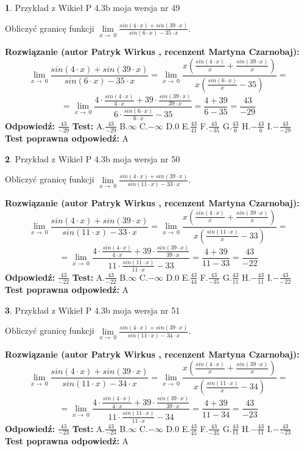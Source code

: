 \documentclass[12pt, a4paper]{article}
\theoremstyle{definition} %
\newtheorem{zad}{}
\newcommand{\zadStart}[1]{\begin{zad}#1\newline}
\newcommand{\zadStop}{\end{zad}}
\newcommand{\rozwStart}[2]{\noindent \textbf{Rozwiązanie (autor #1 , recenzent #2): }\newline}
\newcommand{\rozwStop}{\newline}
\newcommand{\odpStart}{\noindent \textbf{Odpowiedź:}\newline}
\newcommand{\odpStop}{\newline}
\newcommand{\testStart}{\noindent \textbf{Test:}\newline}
\newcommand{\testStop}{\newline}
\newcommand{\kluczStart}{\noindent \textbf{Test poprawna odpowiedź:}\newline}
\newcommand{\kluczStop}{\newline}
\begin{document}
\zadStart{Przykład z Wikieł P 4.3b moja wersja nr 49}


Obliczyć granicę funkcji $\lim\limits_{x\to\ 0}\frac{sin(4 \cdot x)+sin(39 \cdot x)}{sin(6 \cdot x)-35 \cdot x}$.
\zadStop
\rozwStart{Patryk Wirkus}{Martyna Czarnobaj}
$$\lim\limits_{x\to\ 0}\frac{sin(4 \cdot x)+sin(39 \cdot x)}{sin(6 \cdot x)-35 \cdot x}=\lim\limits_{x\to\ 0}\frac{x(\frac{sin(4 \cdot x)}{x}+\frac{sin(39 \cdot x)}{x})}{x(\frac{sin(6 \cdot x)}{x}-35)}=$$
$$=\lim\limits_{x\to\ 0}\frac{4 \cdot \frac{sin(4 \cdot x)}{4 \cdot x}+39 \cdot \frac{sin(39 \cdot x)}{39 \cdot x}}{6 \cdot \frac{sin(6 \cdot x)}{6 \cdot x}-35}=\frac{4+39}{6-35} = \frac{43}{-29}$$
\rozwStop
\odpStart
$\frac{43}{-29}$
\odpStop
\testStart
A.$\frac{43}{-29}$
B.$\infty$
C.$-\infty$
D.$0$
E.$\frac{43}{41}$
F.$\frac{43}{-35}$
G.$\frac{43}{6}$
H.$-\frac{43}{6}$
I.$-\frac{43}{-29}$
\testStop
\kluczStart
A
\kluczStop



\zadStart{Przykład z Wikieł P 4.3b moja wersja nr 50}


Obliczyć granicę funkcji $\lim\limits_{x\to\ 0}\frac{sin(4 \cdot x)+sin(39 \cdot x)}{sin(11 \cdot x)-33 \cdot x}$.
\zadStop
\rozwStart{Patryk Wirkus}{Martyna Czarnobaj}
$$\lim\limits_{x\to\ 0}\frac{sin(4 \cdot x)+sin(39 \cdot x)}{sin(11 \cdot x)-33 \cdot x}=\lim\limits_{x\to\ 0}\frac{x(\frac{sin(4 \cdot x)}{x}+\frac{sin(39 \cdot x)}{x})}{x(\frac{sin(11 \cdot x)}{x}-33)}=$$
$$=\lim\limits_{x\to\ 0}\frac{4 \cdot \frac{sin(4 \cdot x)}{4 \cdot x}+39 \cdot \frac{sin(39 \cdot x)}{39 \cdot x}}{11 \cdot \frac{sin(11 \cdot x)}{11 \cdot x}-33}=\frac{4+39}{11-33} = \frac{43}{-22}$$
\rozwStop
\odpStart
$\frac{43}{-22}$
\odpStop
\testStart
A.$\frac{43}{-22}$
B.$\infty$
C.$-\infty$
D.$0$
E.$\frac{43}{44}$
F.$\frac{43}{-35}$
G.$\frac{43}{11}$
H.$-\frac{43}{11}$
I.$-\frac{43}{-22}$
\testStop
\kluczStart
A
\kluczStop



\zadStart{Przykład z Wikieł P 4.3b moja wersja nr 51}


Obliczyć granicę funkcji $\lim\limits_{x\to\ 0}\frac{sin(4 \cdot x)+sin(39 \cdot x)}{sin(11 \cdot x)-34 \cdot x}$.
\zadStop
\rozwStart{Patryk Wirkus}{Martyna Czarnobaj}
$$\lim\limits_{x\to\ 0}\frac{sin(4 \cdot x)+sin(39 \cdot x)}{sin(11 \cdot x)-34 \cdot x}=\lim\limits_{x\to\ 0}\frac{x(\frac{sin(4 \cdot x)}{x}+\frac{sin(39 \cdot x)}{x})}{x(\frac{sin(11 \cdot x)}{x}-34)}=$$
$$=\lim\limits_{x\to\ 0}\frac{4 \cdot \frac{sin(4 \cdot x)}{4 \cdot x}+39 \cdot \frac{sin(39 \cdot x)}{39 \cdot x}}{11 \cdot \frac{sin(11 \cdot x)}{11 \cdot x}-34}=\frac{4+39}{11-34} = \frac{43}{-23}$$
\rozwStop
\odpStart
$\frac{43}{-23}$
\odpStop
\testStart
A.$\frac{43}{-23}$
B.$\infty$
C.$-\infty$
D.$0$
E.$\frac{43}{45}$
F.$\frac{43}{-35}$
G.$\frac{43}{11}$
H.$-\frac{43}{11}$
I.$-\frac{43}{-23}$
\testStop
\kluczStart
A
\kluczStop
\end{document}
